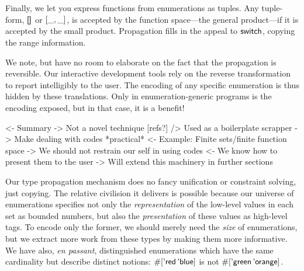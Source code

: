 Finally, we let you express functions from enumerations as tuples.
Any tuple-form, \(\void\) or \(\pair{\_}{\_}{}\), is accepted by the
function space---the general product---if it is accepted by the
small product. Propagation fills in the appeal to $\F{switch}$,
copying the range information.


We note, but have no room to elaborate on the fact that the propagation
is reversible. Our interactive development tools rely on the
reverse transformation to report intelligibly to the user.
The encoding of any specific enumeration is thus hidden by these
translations. Only in enumeration-generic programs is the
encoding exposed, but in that case, it is a benefit!

\begin{wstructure}
<- Summary
    -> Not a novel technique [refs?]
        /> Used as a boilerplate scrapper
    -> Make dealing with codes *practical*
        <- Example: Finite sets/finite function space
        -> We should not restrain our self in using codes
            <- We know how to present them to the user
-> Will extend this machinery in further sections
\end{wstructure}



Our type propagation mechanism does no fancy unification or constraint
solving, just copying.  The relative civilision it delivers is
possible because our universe of enumerations specifies not only the
\emph{representation} of the low-level values in each set as bounded
numbers, but also the \emph{presentation} of these values as
high-level tags. To encode only the former, we should merely need the
\emph{size} of enumerations, but we extract more work from these types
by making them more informative.  We have also, \emph{en passant},
distinguished enumerations which have the same cardinality but
describe distinct notions:
\(\EnumT{\sqr{\etag{\CN{red}}\,\etag{\CN{blue}}}}\) is not
\(\EnumT{\sqr{\etag{\CN{green}}\,\etag{\CN{orange}}}}\).
